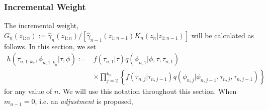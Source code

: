 \documentclass[12pt,a4paper]{article}
\begin{document}
\subsubsection{Incremental Weight}
The incremental weight, $G_n\left(z_{1:n}\right):= \hat{\gamma}_n\left(z_{1:n}\right) / \left[\hat{\gamma}_{n-1}\left(z_{1:n-1}\right)K_n\left(z_{n}|z_{1:n-1}\right)\right]$ will be calculated as follows. In this section, we set     
\begin{equation*}
        \begin{split}
            h\left(\tau_{n,1:k_n},\phi_{n,1:k_n}|\tau,\phi \right) := &f\left(\tau_{n,1}| \tau\right) q\left(\phi_{n,1}|\phi,\tau,\tau_{n,1}\right)\\
             & \times \prod_{j=2}^{k_n} \left\{f(\tau_{n,j}|\tau_{n,j-1})q(\phi_{n,j}|\phi_{n,j-1},\tau_{n,j},\tau_{n,j-1})\right\}
        \end{split}
\end{equation*}
for any value of $n$. We will use this notation throughout this section. 
When $m_{n-1} = 0$, i.e. an \textit{adjustment} is proposed,
\end{document}
